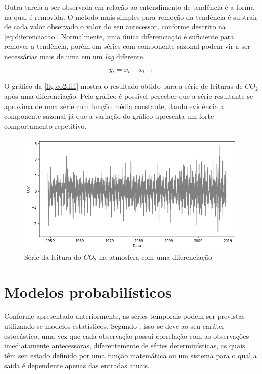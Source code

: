 \documentclass[
    12pt,
    oneside,
    a4paper,
    english,
    brazil
]{abntex2}
\begin{document}
Outra tarefa a ser observada em relação  ao entendimento de tendência é a forma
na qual é removida. O método mais  simples para remoção da tendência é subtrair
de  cada valor  observado  o  valor do  seu  antecessor,  conforme descrito  na
\autoref{eq:diferenciacao}. Normalmente,  uma única diferenciação  é suficiente
para remover  a tendência, porém em  séries com componente sazonal  podem vir a
ser necessárias mais de uma em um \textit{lag} diferente.

\begin{equation}
    \label{eq:diferenciacao}
    y_t = x_t - x_{t-1}
\end{equation}

O gráfico  da \autoref{fig:co2diff} mostra o  resultado obtido para a  série de
leituras de $CO_2$ após uma diferenciação. Pelo gráfico é possível perceber que
a série resultante  se aproxima de uma série com  função média constante, dando
evidência a componente sazonal já que  a variação do gráfico apresenta um forte
comportamento repetitivo.

\begin{figure}[ht]
    \centering
    \caption{Série da leitura do $CO_2$ na atmosfera com uma
        diferenciação}\label{fig:co2diff}
    \includegraphics[width=.5\linewidth]{images/co2_diff.png}
\end{figure}

\section{Modelos probabilísticos}

Conforme  apresentado anteriormente,  as séries  temporais podem  ser previstas
utilizando-se modelos  estatísticos. Segundo , isso  se deve
ao  seu caráter  estocástico, uma  vez  que cada  observação possui  correlação
com  as  observações  imediatamente   antecessoras,  diferentemente  de  séries
determinísticas, as quais têm seu estado  definido por uma função matemática ou
um sistema para o qual a saída é dependente apenas das entradas atuais.
\end{document}
